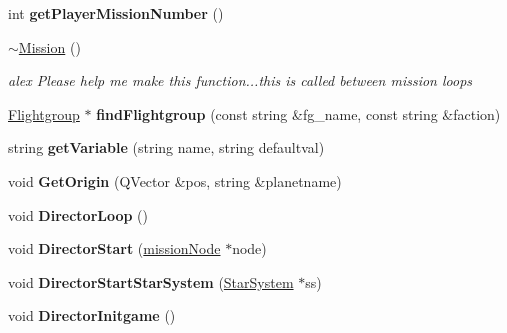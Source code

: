 \begin{DoxyCompactItemize}
\item 
int {\bfseries get\+Player\+Mission\+Number} ()\hypertarget{classMission_a9249df45d832bf95142cf7263cd89048}{}\label{classMission_a9249df45d832bf95142cf7263cd89048}

\item 
\hyperlink{classMission_ad1a61b34162393ac42be5955d9772921}{$\sim$\+Mission} ()\hypertarget{classMission_ad1a61b34162393ac42be5955d9772921}{}\label{classMission_ad1a61b34162393ac42be5955d9772921}

\begin{DoxyCompactList}\small\item\em alex Please help me make this function...this is called between mission loops \end{DoxyCompactList}\item 
\hyperlink{classFlightgroup}{Flightgroup} $\ast$ {\bfseries find\+Flightgroup} (const string \&fg\+\_\+name, const string \&faction)\hypertarget{classMission_ad3350eb7945bfdac9a1025b1775f3041}{}\label{classMission_ad3350eb7945bfdac9a1025b1775f3041}

\item 
string {\bfseries get\+Variable} (string name, string defaultval)\hypertarget{classMission_a1280b13e9d46aa053ed83aaaa8cf076d}{}\label{classMission_a1280b13e9d46aa053ed83aaaa8cf076d}

\item 
void {\bfseries Get\+Origin} (Q\+Vector \&pos, string \&planetname)\hypertarget{classMission_a476f5d0f4340ed548b1ef7b5fc5e435f}{}\label{classMission_a476f5d0f4340ed548b1ef7b5fc5e435f}

\item 
void {\bfseries Director\+Loop} ()\hypertarget{classMission_ad8042c87af63022718fa78fdf28c5fa2}{}\label{classMission_ad8042c87af63022718fa78fdf28c5fa2}

\item 
void {\bfseries Director\+Start} (\hyperlink{classmissionNode}{mission\+Node} $\ast$node)\hypertarget{classMission_a806f9aa19212743b97f69cb755684e7d}{}\label{classMission_a806f9aa19212743b97f69cb755684e7d}

\item 
void {\bfseries Director\+Start\+Star\+System} (\hyperlink{classStarSystem}{Star\+System} $\ast$ss)\hypertarget{classMission_a65c923b0d3feaf415d651acb02671f03}{}\label{classMission_a65c923b0d3feaf415d651acb02671f03}

\item 
void {\bfseries Director\+Initgame} ()\hypertarget{classMission_a3377bcac8f71bb18c6b07135e82da114}{}\label{classMission_a3377bcac8f71bb18c6b07135e82da114}


\end{DoxyCompactItemize}
